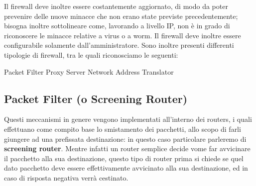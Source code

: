 Il firewall deve inoltre essere costantemente aggiornato, di modo da poter 
prevenire delle nuove minacce che non erano state previste precedentemente; bisogna
inoltre sottolineare come, lavorando a livello IP, non è in grado di riconoscere
le minacce relative a virus o a worm. Il firewall deve inoltre essere configurabile
solamente dall'amministratore. Sono inoltre presenti differenti tipologie di
firewall, tra le quali riconosciamo le seguenti:
\begin{itemize}
\diam Packet Filter
\diam Proxy Server
\diam Network Address Translator
\end{itemize}

\subsection{Packet Filter (o Screening Router)}
Questi meccanismi in genere vengono implementati all'interno dei routers, i quali
effettuano come compito base lo smistamento dei pacchetti, allo scopo di farli
giungere ad una prefissata destinazione: in questo caso particolare parleremo di
\textbf{screening router}.  Mentre infatti un router semplice decide vome far avvicinare 
il pacchetto alla sua destinazione, questo tipo di router prima si chiede se
quel dato pacchetto deve essere effettivamente avvicinato alla sua destinazione,
ed in caso di risposta negativa verrà cestinato.

